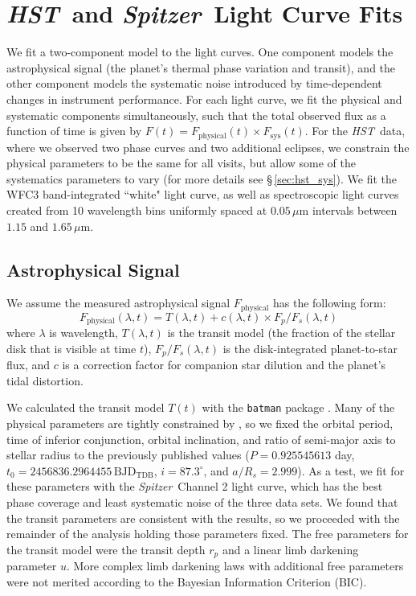 \documentclass[twocolumn, trackchanges]{aastex61}
\newcommand{\project}[1]{\textsl{#1}}
\newcommand{\HST}{\project{HST}}
\newcommand{\Spitzer}{\project{Spitzer}}
\begin{document}
\section{\HST\ and \Spitzer\ Light Curve Fits}
\label{sec:fits}
We fit a two-component model to the light curves. One component models the astrophysical signal (the planet's thermal phase variation and transit), and the other component models the systematic noise introduced by time-dependent changes in instrument performance. For each light curve, we fit the physical and systematic components simultaneously, such that the total observed flux as a function of time is given by $F(t) = F_\mathrm{physical}(t) \times F_\mathrm{sys}(t)$. For the \HST\ data, where we observed two phase curves and two additional eclipses, we constrain the physical parameters to be the same for all visits, but allow some of the systematics parameters to vary (for more details see \S\,\ref{sec:hst_sys}). We fit the WFC3 band-integrated ``white" light curve, as well as spectroscopic light curves created from 10 wavelength bins uniformly spaced at $0.05\,\mu$m intervals between $1.15$ and $1.65\,\mu$m.

\subsection{Astrophysical Signal}
We assume the measured astrophysical signal $F_\mathrm{physical}$ has the following form:
\begin{equation}
	F_\mathrm{physical}(\lambda, t) =  T(\lambda, t) + c(\lambda, t) \times F_p/F_s(\lambda, t)
\end{equation}
where $\lambda$ is wavelength, $T(\lambda, t)$ is the transit model (the fraction of the stellar disk that is visible at time $t$), $F_p/F_s(\lambda, t)$ is the disk-integrated planet-to-star flux, and $c$ is a correction factor for companion star dilution and the planet's tidal distortion. 

We calculated the transit model $T(t)$ with the \texttt{batman} package \citep{kreidberg15a}. Many of the physical parameters are tightly constrained by \cite{southworth15}, so we fixed the orbital period, time of inferior conjunction, orbital inclination, and ratio of semi-major axis to stellar radius to the previously published values ($P = 0.925545613$ day, $t_0 = 2456836.2964455\,\mathrm{BJD_{TDB}}$, $i = 87.3^\circ$, and $a/R_s = 2.999$). As a test, we fit for these parameters with the \Spitzer\ Channel 2 light curve, which has the best phase coverage and least systematic noise of the three data sets. We found that the transit parameters are consistent with the \cite{southworth15} results, so we proceeded with the remainder of the analysis holding those parameters fixed.  The free parameters for the transit model were the transit depth $r_p$ and a linear limb darkening parameter $u$. More complex limb darkening laws with additional free parameters were not merited according to the Bayesian Information Criterion (BIC).
\end{document}
